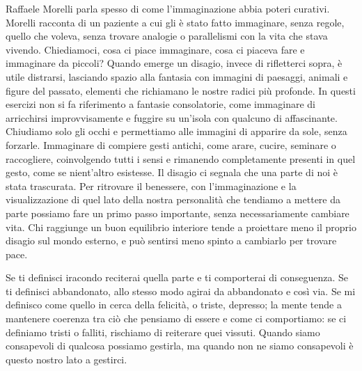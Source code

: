 \documentclass[12pt]{book} %
\begin{document}
Raffaele Morelli parla spesso di come l'immaginazione abbia poteri curativi. Morelli racconta di un
paziente a cui gli è stato fatto immaginare, senza regole, quello che voleva, senza trovare analogie o parallelismi con
la vita che stava vivendo. Chiediamoci, cosa ci piace immaginare, cosa ci piaceva fare e immaginare da piccoli?
Quando emerge un disagio, invece di rifletterci sopra, è utile distrarsi, lasciando spazio alla fantasia con immagini di paesaggi, animali e figure del passato, elementi che richiamano le nostre radici più profonde. In questi esercizi non si fa riferimento a fantasie consolatorie, come immaginare di arricchirsi improvvisamente e fuggire su un’isola con qualcuno di affascinante. Chiudiamo solo gli occhi e permettiamo alle immagini di apparire da sole, senza forzarle. Immaginare di compiere gesti antichi, come arare, cucire, seminare o raccogliere, coinvolgendo tutti i sensi e rimanendo completamente presenti in quel gesto, come se nient’altro esistesse.
Il disagio ci segnala che una parte di noi è stata trascurata. Per ritrovare il benessere, con l'immaginazione e la visualizzazione di quel lato della nostra personalità che tendiamo a mettere da parte possiamo fare un primo passo importante, senza necessariamente cambiare vita. Chi raggiunge un buon equilibrio interiore tende a proiettare meno il proprio disagio sul mondo esterno, e può sentirsi meno spinto a cambiarlo per trovare pace.

Se ti definisci iracondo reciterai quella parte e ti
comporterai di conseguenza. Se ti definisci abbandonato, allo stesso modo agirai da abbandonato e così via. 
Se mi definisco come quello in cerca della felicità, o triste, depresso; la mente tende a mantenere coerenza tra ciò che pensiamo di essere e come ci comportiamo: se ci definiamo tristi o falliti, rischiamo di reiterare quei vissuti.
Quando siamo consapevoli di qualcosa possiamo gestirla, ma quando non ne siamo consapevoli è questo nostro lato a gestirci.
\end{document}
